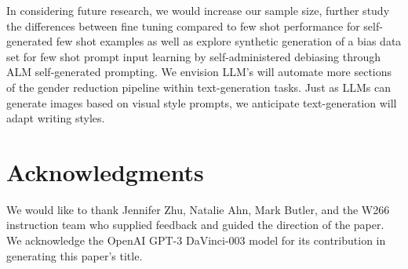 \documentclass[11pt]{article}
\begin{document}
In considering future research, we would increase our sample size, further study the differences between fine tuning compared to few shot performance for  self-generated few shot examples as well as explore  synthetic generation of a bias data set for few shot prompt input learning by self-administered debiasing through ALM self-generated prompting. We envision LLM's will automate more sections of the gender reduction pipeline within text-generation tasks. Just as LLMs can generate images based on visual style prompts, we anticipate text-generation will adapt writing styles. 


\section{Acknowledgments}
We would like to thank Jennifer Zhu, Natalie Ahn, Mark Butler, and the W266 instruction team who supplied feedback and guided the direction of the paper. We acknowledge the OpenAI GPT-3 DaVinci-003 model for its contribution in generating this paper's title.


\end{document}
